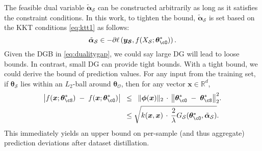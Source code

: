 The feasible dual variable  $\tilde{\boldsymbol{\alpha}}_\mathcal{S}$ can be constructed arbitrarily as long as it satisfies the constraint conditions. In this work, to tighten the bound, $\tilde{\boldsymbol{\alpha}}_\mathcal{S}$ is set based on the KKT conditions \eqref{eq:ktt1} as follows:
\begin{equation}
  \tilde{\boldsymbol{\alpha}}_{\mathcal{S}} \in -\partial \ell\left(\boldsymbol{y_\mathcal{S}},  f (X_\mathcal{S};  \bm \theta_{\cO}^*)\right).
  \label{eq:alphaapproxi}
\end{equation}
Given the DGB in \eqref{eq:dualitygap}, we could say large DG will lead to loose bounds. In contrast, small DG can provide tight bounds. With a tight bound, we could derive the bound of prediction values. For any input from the training set, if
$\boldsymbol{\theta}_{\mathcal{S}}$ lies within an $L_2$-ball around
$\boldsymbol{\theta}_{\mathcal{O}}$, then for any vector
$\boldsymbol{x} \in \mathbb{R}^d$,
  \begin{equation*}
    \begin{aligned}
      \bigl|f(\boldsymbol{x};\bm \theta_{\cS}^*)\;-\;f(\boldsymbol{x};\bm \theta_{\cO}^*) \bigr| & \;\;\le\;\;\|\boldsymbol{\phi}(\boldsymbol{x})\|_2 \,\cdot\,\bigl\|\bm \theta_{\cO}^* \;-\; \bm \theta_{\cS}^*\bigr\|_2^2.\\                            & \;\;\le\sqrt{k(\boldsymbol{x},\boldsymbol{x}) \,\cdot\, \frac{2}{\lambda}G_{\mathcal{S}}(\bm \theta_{\cO}^*,\tilde{\boldsymbol{\alpha}}_{\mathcal{S}})}.
    \end{aligned}
  \end{equation*}
This immediately yields an upper bound on per-sample (and thus aggregate) prediction deviations after dataset distillation.

